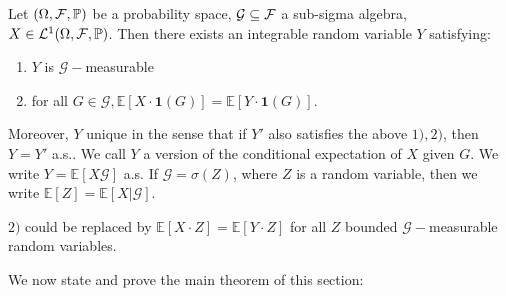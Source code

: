 \documentclass{article}
\begin{document}
\begin{theorem}\label{thm: cond exp}
Let $ (\Omega, \mathcal{F}, \mathbb{P})$ be a probability space, $\mathcal{G}\subseteq \mathcal{F}$ a sub-sigma algebra, $ X\in\mathcal{L}^{1}(\Omega, \mathcal{F}, \mathbb{P})$. Then there exists an integrable random variable $ Y$ satisfying:
\begin{enumerate}
	\item $ Y$ is $\mathcal{G}-$measurable
	\item for all $ G\in\mathcal{G},\mathbb{E}[X\cdot\mathbf{1}(G)]= \mathbb{E}[Y\cdot\mathbf{1}(G)]$.
\end{enumerate}
Moreover, $ Y$ unique in the sense that if $ Y'$ also satisfies the above $ 1),2)$, then $ Y = Y'$ a.s.. We call $ Y$ a version of the conditional expectation of $ X$ given $ G$. We write $ Y =\mathbb{E}[X\mathcal{G}]$ a.s. If $\mathcal{G} = \sigma(Z)$, where $ Z$ is a random variable, then we write $\mathbb{E}[Z] =\mathbb{E}[X|\mathcal{G}]$.

\end{theorem}

\begin{remark}
	$ 2)$ could be replaced by $\mathbb{E}[X\cdot Z] =\mathbb{E}[Y\cdot Z]$ for all $ Z$ bounded $\mathcal{G}-$measurable random variables. 
\end{remark}

We now state and prove the main theorem of this section:
\end{document}
